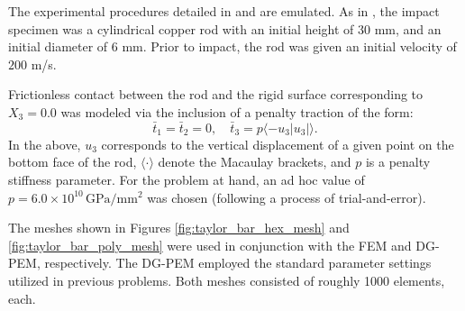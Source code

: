 The experimental procedures detailed in \cite{Johnson&Cook:83} and \cite{Gust:82} are emulated. As in \cite{Johnson&Cook:83}, the impact specimen was a cylindrical copper rod with an initial height of 30 mm, and an initial diameter of 6 mm. Prior to impact, the rod was given an initial velocity of $200$ m/s.

Frictionless contact between the rod and the rigid surface corresponding to $X_3 = 0.0$ was modeled via the inclusion of a penalty traction of the form:
\begin{equation}
	\bar{t}_1 = \bar{t}_2 = 0, \quad \bar{t}_3 = p \langle -u_3|u_3|  \rangle.
\end{equation}
In the above, $u_3$ corresponds to the vertical displacement of a given point on the bottom face of the rod, $\langle \cdot \rangle$ denote the Macaulay brackets, and $p$ is a penalty stiffness parameter. For the problem at hand, an ad hoc value of $p = 6.0 \times 10^{10} \, \text{GPa}/\text{mm}^2$ was chosen (following a process of trial-and-error).

The meshes shown in Figures \ref{fig:taylor_bar_hex_mesh} and \ref{fig:taylor_bar_poly_mesh} were used in conjunction with the FEM and DG-PEM, respectively. The DG-PEM employed the standard parameter settings utilized in previous problems. Both meshes consisted of roughly 1000 elements, each.

